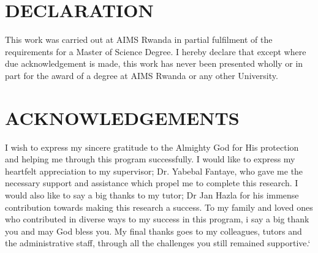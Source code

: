 \chapter*{DECLARATION}
%
%
%
%
%

This work was carried out at AIMS Rwanda in partial fulfilment of the requirements for a Master
of Science Degree.
I hereby declare that except where due acknowledgement is made, this work has never been
presented wholly or in part for the award of a degree at AIMS Rwanda or any other University.

\newpage

\chapter*{ACKNOWLEDGEMENTS}

%
I wish to express my sincere gratitude to the Almighty God for His protection and helping me through this program successfully. I would like to express my heartfelt appreciation to my supervisor; Dr. Yabebal Fantaye, who  gave me the necessary support and assistance which propel me to complete this research. I would also like to say a big thanks to my tutor; Dr Jan Hazla for his immense contribution towards making this research a success. To my  family and loved ones who contributed in diverse ways to my success in this program, i say a big thank you and may God bless you.  My final thanks goes to  my colleagues, tutors and the administrative staff,  through all the challenges you still remained supportive.`